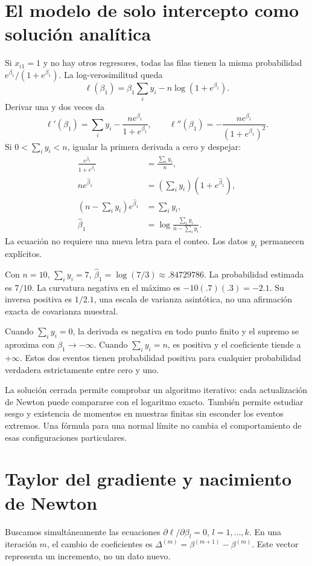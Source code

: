 \documentclass[11pt,a4paper]{article}
\begin{document}
\clearpage
\section{El modelo de solo intercepto como solución analítica}\label{logit39}
Si $x_{i1}=1$ y no hay otros regresores,
todas las filas tienen la misma probabilidad
$e^{\beta_1}/(1+e^{\beta_1})$.
La log-verosimilitud queda
\[
\ell(\beta_1)=\beta_1\sum_i y_i-n\log(1+e^{\beta_1}).
\]
Derivar una y dos veces da
\[
\ell'(\beta_1)=\sum_i y_i-\frac{ne^{\beta_1}}{1+e^{\beta_1}},
\qquad
\ell''(\beta_1)=-\frac{ne^{\beta_1}}{(1+e^{\beta_1})^2}.
\]
Si $0<\sum_i y_i<n$, igualar la primera derivada a cero y despejar:
\[
\begin{aligned}
\frac{e^{\widehat\beta_1}}{1+e^{\widehat\beta_1}}
&=\frac{\sum_i y_i}{n},\\
ne^{\widehat\beta_1}
&=(\sum_i y_i)(1+e^{\widehat\beta_1}),\\
(n-\sum_i y_i)e^{\widehat\beta_1}
&=\sum_i y_i,\\
\boxed{\widehat\beta_1}
&=\boxed{\log\frac{\sum_i y_i}{n-\sum_i y_i}}.
\end{aligned}
\]
La ecuación no requiere una nueva letra para el conteo.
Los datos $y_i$ permanecen explícitos.

\begin{ejemplo}
Con $n=10$, $\sum_i y_i=7$,
$\widehat\beta_1=\log(7/3)\approx.84729786$.
La probabilidad estimada es $7/10$.
La curvatura negativa en el máximo es $-10(.7)(.3)=-2.1$.
Su inversa positiva es $1/2.1$, una escala de varianza asintótica,
no una afirmación exacta de covarianza muestral.
\end{ejemplo}
Cuando $\sum_i y_i=0$, la derivada es negativa en todo punto finito
y el supremo se aproxima con $\beta_1\to-\infty$.
Cuando $\sum_i y_i=n$, es positiva y el coeficiente tiende a $+\infty$.
Estos dos eventos tienen probabilidad positiva para cualquier
probabilidad verdadera estrictamente entre cero y uno.

La solución cerrada permite comprobar un algoritmo iterativo:
cada actualización de Newton puede compararse con el logaritmo exacto.
También permite estudiar sesgo y existencia de momentos en
muestras finitas sin esconder los eventos extremos.
Una fórmula para una normal límite no cambia el comportamiento
de esas configuraciones particulares.

\clearpage
\section{Taylor del gradiente y nacimiento de Newton}\label{logit40}
Buscamos simultáneamente las ecuaciones
$\partial\ell/\partial\beta_l=0$, $l=1,\ldots,k$.
En una iteración $m$, el cambio de coeficientes es
$\Delta^{(m)}=\beta^{(m+1)}-\beta^{(m)}$.
Este vector representa un incremento, no un dato nuevo.
\end{document}
